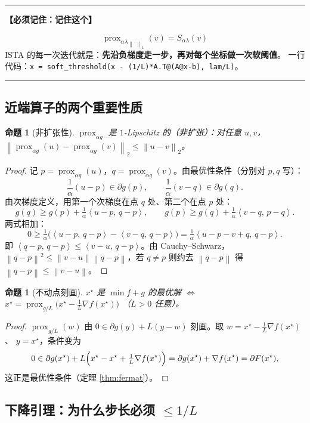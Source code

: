 \documentclass[11pt,a4paper,UTF8]{ctexart}
\theoremstyle{plain}
\newtheorem{proposition}[theorem]{命题}
\theoremstyle{definition}
\theoremstyle{remark}
\newcommand{\norm}[1]{\left\lVert #1 \right\rVert}
\newcommand{\inner}[2]{\left\langle #1,\, #2 \right\rangle}
\newcommand{\prox}{\operatorname{prox}}
\newenvironment{keypoint}[1]
  {\par\medskip\noindent\begin{minipage}{\linewidth}%
   \hrule\smallskip\noindent\textbf{【必须记住：#1】}\par\nopagebreak\smallskip}
  {\smallskip\hrule\end{minipage}\medskip}
\begin{document}
\begin{keypoint}{记住这个}
\[
\boxed{\ \prox_{\alpha\lambda\norm{\cdot}_1}(v)=S_{\alpha\lambda}(v)\ }
\]
ISTA 的每一次迭代就是：\textbf{先沿负梯度走一步，再对每个坐标做一次软阈值}。
一行代码：\texttt{x = soft\_threshold(x - (1/L)*A.T@(A@x-b), lam/L)}。
\end{keypoint}

\subsection{近端算子的两个重要性质}

\begin{proposition}[非扩张性]\label{prop:proxnonexp}
$\prox_{\alpha g}$ 是 $1$-Lipschitz 的（非扩张）：对任意 $u,v$，
$\norm{\prox_{\alpha g}(u)-\prox_{\alpha g}(v)}_2\le\norm{u-v}_2$。
\end{proposition}

\begin{proof}
记 $p=\prox_{\alpha g}(u)$，$q=\prox_{\alpha g}(v)$。由最优性条件（分别对 $p,q$ 写）：
\[
\frac{1}{\alpha}(u-p)\in\partial g(p),\qquad \frac1\alpha(v-q)\in\partial g(q).
\]
由次梯度定义，用第一个次梯度在点 $q$ 处、第二个在点 $p$ 处：
\[
g(q)\ge g(p)+\tfrac1\alpha\inner{u-p}{q-p},\qquad
g(p)\ge g(q)+\tfrac1\alpha\inner{v-q}{p-q}.
\]
两式相加：
\[
0\ge\tfrac1\alpha\bigl(\inner{u-p}{q-p}-\inner{v-q}{q-p}\bigr)
=\tfrac1\alpha\inner{u-p-v+q}{q-p}.
\]
即 $\inner{q-p}{q-p}\le\inner{v-u}{q-p}$。由 Cauchy--Schwarz，
$\norm{q-p}^2\le\norm{v-u}\norm{q-p}$，若 $q\neq p$ 则约去 $\norm{q-p}$ 得 $\norm{q-p}\le\norm{v-u}$。
\end{proof}

\begin{proposition}[不动点刻画]\label{prop:proxfix}
$x^\star$ 是 $\min f+g$ 的最优解 $\iff$ $x^\star=\prox_{g/L}\bigl(x^\star-\tfrac1L\nabla f(x^\star)\bigr)$
（$L>0$ 任意）。
\end{proposition}

\begin{proof}
$\prox_{g/L}(w)$ 由 $0\in\partial g(y)+L(y-w)$ 刻画。取 $w=x^\star-\frac1L\nabla f(x^\star)$、
$y=x^\star$，条件变为
\[
0\in\partial g(x^\star)+L\Bigl(x^\star-x^\star+\tfrac1L\nabla f(x^\star)\Bigr)
=\partial g(x^\star)+\nabla f(x^\star)=\partial F(x^\star),
\]
这正是最优性条件（定理 \ref{thm:fermat}）。
\end{proof}

\subsection{下降引理：为什么步长必须 $\le 1/L$}
\end{document}

